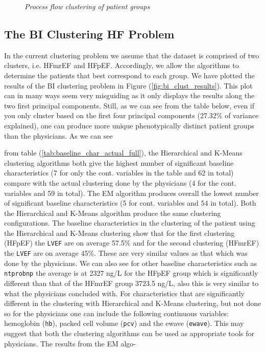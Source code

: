 \documentclass[../thesis.tex]{subfiles}
\begin{document}
\begin{figure}
    \centering
    
    \caption[Process flow clustering of patient groups]{\textit{Process flow clustering of patient groups}}
    \label{fig:process_flow_clustering}
\end{figure}

\vspace*{-0,5cm}\subsection{The BI Clustering HF Problem}
\label{subsec:bi_clust}

In the current clustering problem we assume that the dataset is comprised of two clusters, i.e. HFmrEF and HFpEF. Accordingly, we allow the algorithms to determine the patients that best correspond to each group. We have plotted the results of the BI clustering problem in Figure (\ref{fig:bi_clust_results}). This plot can in many ways seem very misguiding as it only displays the results along the two first principal components. Still, as we can see from the table below, even if you only cluster based on the first four principal components (27.32\% of variance explained), one can produce more unique phenotypically distinct patient groups than the physicians. As we can see   





\noindent from table (\ref{tab:baseline_char_actual_full}), the  Hierarchical and K-Means clustering algorithms both give the highest number of significant baseline characteristics (7 for only the cont. variables in the table and 62 in total) compare with the actual clustering done by the physicians (4 for the cont. variables and 59 in total). The EM algorithm produces overall the lowest number of significant baseline characteristics (5 for cont. variables and 54 in total). Both the Hierarchical and K-Means algorithm produce the same clustering configurations. The baseline characteristics in the clustering of the patient using the Hierarchical and K-Means clustering show that for the first clustering (HFpEF) the \texttt{LVEF} are on average 57.5\% and for the second clustering (HFmrEF) the \texttt{LVEF} are on average 45\%. These are very similar values as that which was done by the physicians. We can also see for other baseline characteristics such as \texttt{ntprobnp} the average is at 2327 ng/L for the HFpEF group which is significantly different than that of the HFmrEF group 3723.5 ng/L, also this is very similar to what the physicians concluded with. For characteristics that are significantly different in the clustering with Hierarchical and K-Means clustering, but not done so for the physicians one can include the following continuous variables: hemoglobin (\texttt{hb}), packed cell volume (\texttt{pcv}) and the ewave (\texttt{ewave}). This may suggest that both the clustering algorithms can be used as appropriate tools for physicians. The results from the EM algo-
\end{document}
